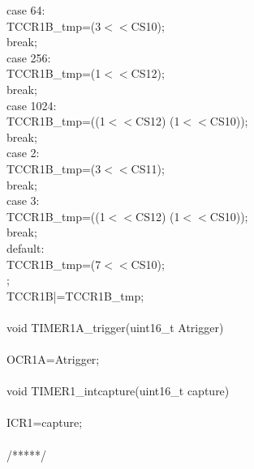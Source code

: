 \documentclass[titlepage, a4paper, 10pt, reqno, openany]{report}
\begin{document}
\begin{minipage}[t]{.35\linewidth}
	\hspace*{1cm}		case 64: \\
	\hspace*{1.5cm}			TCCR1B\_tmp=(3$<<$CS10); \\
	\hspace*{1.5cm}			break; \\
	\hspace*{1cm}		case 256: \\
	\hspace*{1.5cm}			TCCR1B\_tmp=(1$<<$CS12); \\
	\hspace*{1.5cm}			break; \\
	\hspace*{1cm}		case 1024: \\
	\hspace*{1.5cm}			TCCR1B\_tmp=((1$<<$CS12) \textbar (1$<<$CS10)); \\
	\hspace*{1.5cm}			break; \\
	\hspace*{1cm}		case 2: \\
	\hspace*{1.5cm}			TCCR1B\_tmp=(3$<<$CS11); \\
	\hspace*{1.5cm}			break; \\
	\hspace*{1cm}		case 3: \\
	\hspace*{1.5cm}			TCCR1B\_tmp=((1$<<$CS12) \textbar (1$<<$CS10)); \\
	\hspace*{1.5cm}			break; \\
	\hspace*{1cm}		default: \\
	\hspace*{1.5cm}			TCCR1B\_tmp=(7$<<$CS10); \\
	\hspace*{.5cm}	\textbraceright ; \\
	\hspace*{.5cm}	TCCR1B|=TCCR1B\_tmp; \\
	\textbraceright \\
	void TIMER1A\_trigger(uint16\_t Atrigger) \\
	\textbraceleft \\
	\hspace*{.5cm}	OCR1A=Atrigger; \\
	\textbraceright \\
	void TIMER1\_intcapture(uint16\_t capture) \\
	\textbraceleft \\
	\hspace*{.5cm}	ICR1=capture; \\
	\textbraceright \\
	/*****/
\end{minipage}
\end{document}
